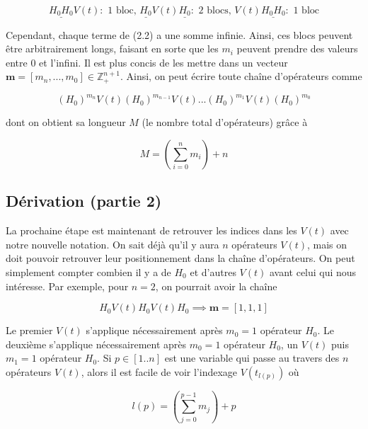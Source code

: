 \begin{equation*}
    \underline{H_0H_0}V(t) : \text{ 1 bloc, } \underline{H_0}V(t)\underline{H_0} : \text{ 2 blocs, } V(t)\underline{H_0H_0} : \text{ 1 bloc}
\end{equation*}



Cependant, chaque terme de (2.2) a une somme infinie. Ainsi, ces blocs peuvent être arbitrairement longs, faisant en sorte que les $m_i$ peuvent prendre des valeurs entre 0 et l'infini. Il est plus concis de les mettre dans un vecteur $\boldsymbol{m} = \left[m_n, ..., m_0\right] \in \mathbb{Z}^{n+1}_+$. Ainsi, on peut écrire toute chaîne d'opérateurs comme 

\begin{equation}
    (H_0)^{m_n}V(t)(H_0)^{m_{n-1}}V(t)...(H_0)^{m_1}V(t)(H_0)^{m_0}
\end{equation}

dont on obtient sa longueur $M$ (le nombre total d'opérateurs) grâce à 

\begin{equation}
    M = \left(\sum_{i=0}^{n}m_i\right) + n
\end{equation}

\subsection{Dérivation (partie 2)}
La prochaine étape est maintenant de retrouver les indices dans les $V(t)$ avec notre nouvelle notation. On sait déjà qu'il y aura $n$ opérateurs $V(t)$, mais on doit pouvoir retrouver leur positionnement dans la chaîne d'opérateurs. On peut simplement compter combien il y a de $H_0$ et d'autres $V(t)$ avant celui qui nous intéresse. Par exemple, pour $n=2$, on pourrait avoir la chaîne

\begin{equation*}
    H_0V(t)H_0V(t)H_0 \implies \boldsymbol{m} = \left[1, 1, 1\right]
\end{equation*}

Le premier $V(t)$ s'applique nécessairement après $m_0 = 1$ opérateur $H_0$. Le deuxième s'applique nécessairement après $m_0 = 1$ opérateur $H_0$, un $V(t)$ puis $m_1 = 1$ opérateur $H_0$. Si $p \in \left[1..n\right]$ est une variable qui passe au travers des $n$ opérateurs $V(t)$, alors il est facile de voir l'indexage $V(t_{l(p)})$ où

\begin{equation}
    l(p) = \left(\sum_{j=0}^{p-1}m_j\right) + p
\end{equation}

